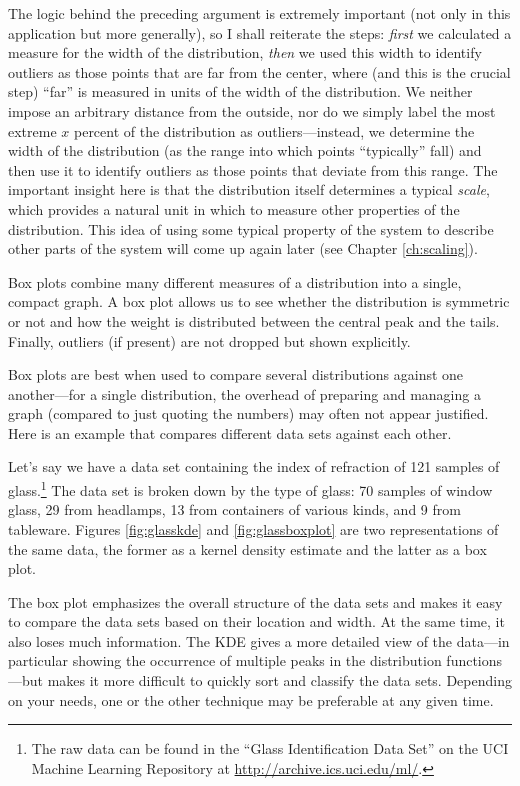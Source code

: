 The logic behind the preceding argument is extremely important (not
only in this application but more generally), so I shall reiterate the
steps: \emph{first} we calculated a measure for the width of the
distribution, \emph{then} we used this width to identify outliers as
those points that are far from the center, where (and this is the
crucial step) ``far'' is measured in units of the width of the
distribution. We neither impose an arbitrary distance from the
outside, nor do we simply label the most extreme $x$ percent of the
distribution as outliers---instead, we determine the width of the
distribution (as the range into which points ``typically'' fall) and
then use it to identify outliers as those points that deviate from
this range.  The important insight here is that the distribution
itself determines a typical \emph{scale}, which provides a natural
unit in which\vadjust{\pagebreak} to measure other properties of the distribution. This
idea of using some typical property of the system to describe other
parts of the system will come up again later (see Chapter
\ref{ch:scaling}).

Box plots combine many different measures of a distribution into a
single, compact graph. A box plot allows us to see whether the
distribution is symmetric or not and how the weight is distributed
between the central peak and the tails. Finally, outliers (if present)
are not dropped but shown explicitly.

Box plots are best when used to compare several distributions against
one another---for a single distribution, the overhead of preparing
and managing a graph (compared to just quoting the numbers) may often 
not appear justified. Here is an example that compares different data
sets against each other.

Let's say we have a data set containing the index of refraction of 121
samples of glass.\footnote{The raw data can be found in the ``Glass
  Identification Data Set'' on the UCI Machine Learning Repository at
  \url{http://archive.ics.uci.edu/ml/}.} The data
set is broken down by the type of glass: 70 samples of window glass,
29 from headlamps, 13 from containers of various kinds, and 9 from
tableware. Figures \ref{fig:glasskde} and \ref{fig:glassboxplot} are
two representations of the same data, the former as a kernel density
estimate and the latter as a box plot.

The box plot emphasizes the overall structure of the data sets and
makes it easy to compare the data sets based on their location and
width. At the same time, it also loses much information. The KDE gives
a more detailed view of the data---in particular showing the
occurrence of multiple peaks in the distribution functions---but makes
it more difficult to quickly sort and classify the data sets.
Depending on your needs, one or the other technique may be preferable
at any given time.

